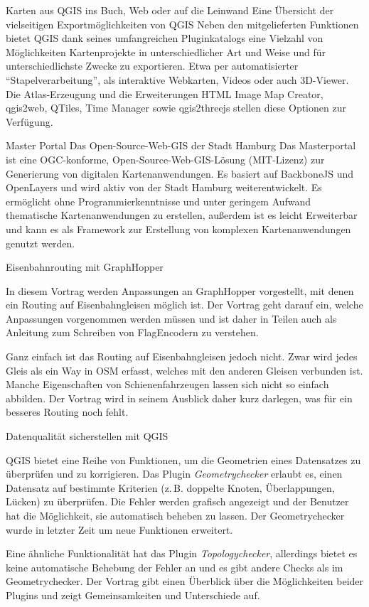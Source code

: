 %
{Karten aus QGIS ins Buch, Web oder auf die Leinwand}%
{Eine Übersicht der vielseitigen Exportmöglichkeiten von QGIS}%
{%
Neben den mitgelieferten Funktionen bietet QGIS dank seines umfangreichen Pluginkatalogs eine
Vielzahl von Möglichkeiten Kartenprojekte in unterschiedlicher Art und Weise und für
unterschiedlichste Zwecke zu exportieren. Etwa per automatisierter "`Stapelverarbeitung"', als
interaktive Webkarten, Videos oder auch 3D-Viewer. Die Atlas-Erzeugung und die Erweiterungen HTML Image
Map Creator, qgis2web, QTiles, Time Manager sowie qgis2threejs stellen diese Optionen zur Verfügung.%
}

%
{Master Portal}%
{Das Open-Source-Web-GIS der Stadt Hamburg}%
{%
  Das Masterportal ist eine OGC-konforme, Open-Source-Web-GIS-Lösung (MIT-Lizenz) zur Generierung von digitalen
Kartenanwendungen. Es basiert auf BackboneJS und OpenLayers und wird aktiv von der Stadt Hamburg
weiterentwickelt. Es ermöglicht ohne Programmierkenntnisse und unter geringem Aufwand thematische
Kartenanwendungen zu erstellen, außerdem ist es leicht Erweiterbar und kann es als Framework zur
Erstellung von komplexen Kartenanwendungen genutzt werden.%
}

%
{Eisenbahnrouting mit GraphHopper}%
{}%
{%
In diesem Vortrag werden Anpassungen an GraphHopper vorgestellt, mit denen ein Routing auf
Eisenbahngleisen möglich ist. Der Vortrag geht darauf ein, welche Anpassungen vorgenommen werden
müssen und ist daher in Teilen auch als Anleitung zum Schreiben von FlagEncodern zu verstehen.

Ganz einfach ist das Routing auf Eisenbahngleisen jedoch nicht. Zwar wird jedes Gleis als ein Way in
OSM erfasst, welches mit den anderen Gleisen verbunden ist. Manche Eigenschaften von
Schienenfahrzeugen lassen sich nicht so einfach abbilden. Der Vortrag wird in seinem Ausblick daher
kurz darlegen, was für ein besseres Routing noch fehlt.%
}


%
{Datenqualität sicherstellen mit QGIS}%
{}%
{%
QGIS bietet eine Reihe von Funktionen, um die Geometrien eines Datensatzes zu
überprüfen und zu korrigieren. Das Plugin \emph{Geometrychecker} erlaubt es, einen
Datensatz auf bestimmte Kriterien (z.\,B. doppelte Knoten, Überlappungen,
Lücken) zu überprüfen. Die Fehler werden grafisch angezeigt und der
Benutzer hat die Möglichkeit, sie automatisch beheben zu lassen. Der
Geometrychecker wurde in letzter Zeit um neue Funktionen erweitert.

Eine ähnliche Funktionalität hat das Plugin \emph{Topologychecker},
allerdings bietet es keine automatische Behebung der Fehler an und es gibt
andere Checks als im Geometrychecker. Der Vortrag gibt einen Überblick über
die Möglichkeiten beider Plugins und zeigt Gemeinsamkeiten und Unterschiede
auf.
}

